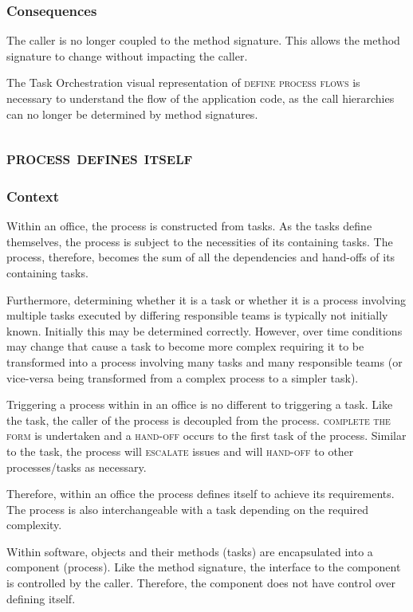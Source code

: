 \documentclass[prodmode]{style/acmlarge}
\begin{document}
\subsubsection*{Consequences} The caller is no longer coupled to the method
signature.  This allows the method signature to change without impacting the
caller.

The Task Orchestration visual representation of \textsc{define process flows} is
necessary to understand the flow of the application code, as the call
hierarchies can no longer be determined by method signatures.



\subsection{\textsc{\textbf{process defines itself}}}

\subsubsection*{Context} Within an office, the process is constructed from
tasks.  As the tasks define themselves, the process is subject to the
necessities of its containing tasks.  The process, therefore, becomes the sum of
all the dependencies and hand-offs of its containing tasks.

Furthermore, determining whether it is a task or whether it is a process involving
multiple tasks executed by differing responsible teams is typically not
initially known.  Initially this may be determined correctly.  However, over
time conditions may change that cause a task to become more complex requiring
it to be transformed into a process involving many tasks and many responsible
teams (or vice-versa being transformed from a complex process to a simpler task).

Triggering a process within in an office is no different to triggering a task.
Like the task, the caller of the process is decoupled from the process.
\textsc{complete the form} is undertaken and a \textsc{hand-off} occurs to the
first task of the process.  Similar to the task, the process will
\textsc{escalate} issues and will \textsc{hand-off} to other processes/tasks as
necessary.

Therefore, within an office the process defines itself to achieve its
requirements.  The process is also interchangeable with a task depending on the
required complexity.

Within software, objects and their methods (tasks) are encapsulated into a
component (process).  Like the method signature, the interface to the component
is controlled by the caller.  Therefore, the component does not have control
over defining itself.
\end{document}
